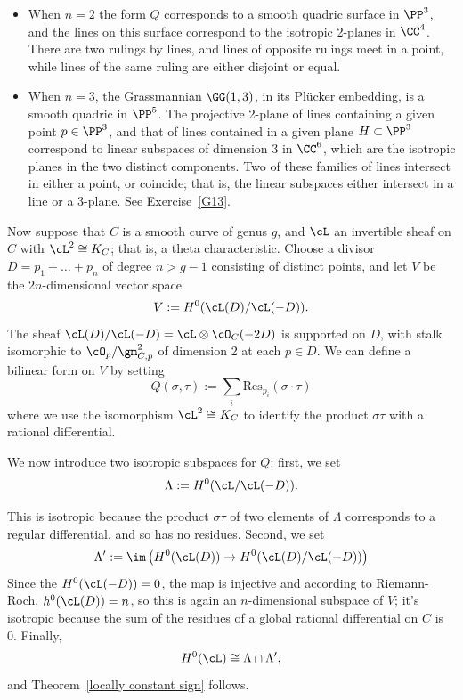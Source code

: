 \begin{example}
\begin{itemize}

\item When $n=2$ the form $Q$ corresponds to a smooth quadric surface in $\PP^3$, and the lines on this surface correspond to the isotropic 2-planes in $\CC^4$. There are two rulings by lines, and lines of opposite rulings meet in a point, while lines of the same ruling are either disjoint or equal. 

\item When $n=3$, the Grassmannian $\GG(1,3)$, in its Pl\"ucker embedding, is a smooth quadric in $\PP^5$. The projective 2-plane of lines containing a given point $p \in \PP^3$, and that of lines contained in a given plane $H \subset \PP^3$
correspond to linear subspaces of dimension 3 in $\CC^6$, which are the isotropic planes in the two distinct components.  Two of these families of lines intersect in either a point, or coincide; that is, the linear subspaces either intersect  in a line or a 3-plane. See Exercise~\ref{G13}.

\end{itemize}
\end{example}

Now suppose that $C$ is a smooth curve of genus $g$, and $\cL$ an invertible sheaf on $C$ with $\cL^2 \cong K_C$; that is, a theta characteristic. Choose a divisor $D = p_1 + \dots + p_n$ of degree $n> g-1$ consisting of distinct points, and let $V$ be the $2n$-dimensional vector space
$$
V := H^0( \cL(D) / \cL(-D) ).
$$
The sheaf $ \cL(D) / \cL(-D) = \cL \otimes \cO_C(-2D) $ is supported on $D$, with stalk 
isomorphic to $\cO_p/\gm_{C,p}^2$ of dimension 2 at each $p \in D$. We can define a bilinear form on $V$ by setting
$$
Q(\sigma, \tau) := \sum_i \text{Res}_{p_i}(\sigma \cdot \tau)
$$
where we use the isomorphism $\cL^2 \cong K_C$ to identify the product $\sigma\tau$ with a rational differential.

We now introduce two isotropic subspaces for $Q$: first, we set
$$
\Lambda := H^0( \cL / \cL(-D) ).
$$

This is isotropic because the product $\sigma\tau$ of two elements of $\Lambda$ corresponds to a regular differential, and so has no residues.  Second, we set
$$
\Lambda' := \im\left( H^0(\cL(D)) \to H^0( \cL(D) / \cL(-D) ) \right)
$$
Since the $H^0(\cL(-D)) = 0$, the map is injective and according to Riemann-Roch, $h^0(\cL(D)) = n$, so this is again an $n$-dimensional subspace of $V$; it's isotropic because the sum of the residues of a global rational differential on $C$ is 0. Finally, 
$$
H^0(\cL) \cong \Lambda \cap \Lambda',
$$
and Theorem~\ref{locally constant sign} follows.

